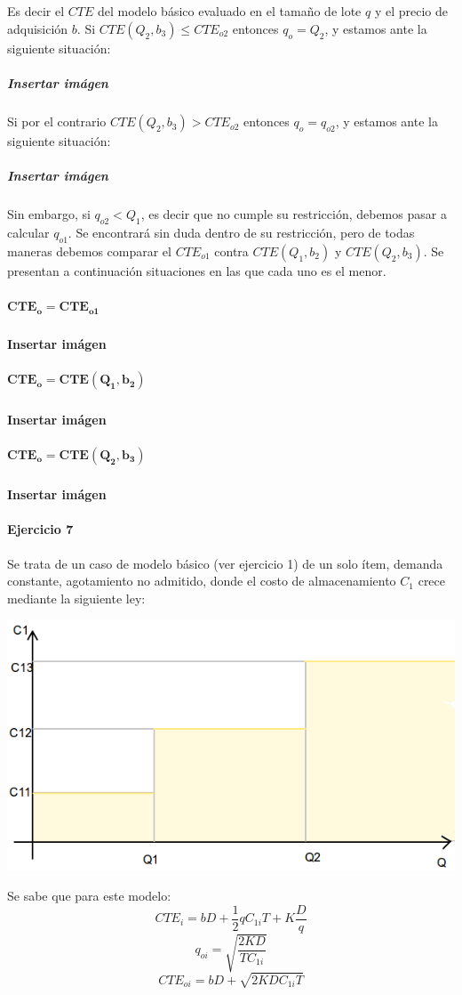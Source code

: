 \documentclass{article}
\begin{document}
	\subparagraph{} Es decir el $CTE$ del modelo básico evaluado en el tamaño de lote $q$ y el precio de adquisición $b$. Si $CTE(Q_2, b_3) \leq CTE_{o2}$ entonces $q_o = Q_2$, y estamos ante la siguiente situación:

	\subparagraph{Insertar imágen}

	\subparagraph{} Si por el contrario $CTE(Q_2, b_3) > CTE_{o2}$ entonces $q_o = q_{o2}$, y estamos ante la siguiente situación:

	\subparagraph{Insertar imágen}

	\subparagraph{} Sin embargo, si $q_{o2} < Q_1$, es decir que no cumple su restricción, debemos pasar a calcular $ q_{o1} $. Se encontrará sin duda dentro de su restricción, pero de todas maneras debemos comparar el $CTE_{o1}$ contra $CTE(Q_1, b_2)$ y $CTE(Q_2, b_3)$. Se presentan a continuación situaciones en las que cada uno es el menor.

	\subparagraph{$\mathbf{CTE_o = CTE_{o1}}$} \textbf{Insertar imágen}

	\subparagraph{$\mathbf{CTE_o = CTE(Q_1, b_2)}$} \textbf{Insertar imágen}

	\subparagraph{$\mathbf{CTE_o = CTE(Q_2, b_3)}$} \textbf{Insertar imágen}

\pagebreak

\paragraph{Ejercicio 7}
Se trata de un caso de modelo básico (ver ejercicio 1) de un solo ítem, demanda constante, agotamiento no admitido, donde el costo de almacenamiento $C_{1}$ crece mediante la siguiente ley:
\begin{center}
  \includegraphics[scale=0.4,keepaspectratio=true]{img/7/7_QvsC1.png} 
\end{center}
Se sabe que para este modelo:
  \begin{equation}\label{7_CTE}CTE_i = bD + \frac{1}{2}qC_{1i}T + K\frac{D}{q} \end{equation}
  $$ q_{oi} = \sqrt{ \frac{2KD}{TC_{1i}}} $$
  $$ CTE_{oi} = bD + \sqrt{ 2KDC_{1i}T }$$
\end{document}
